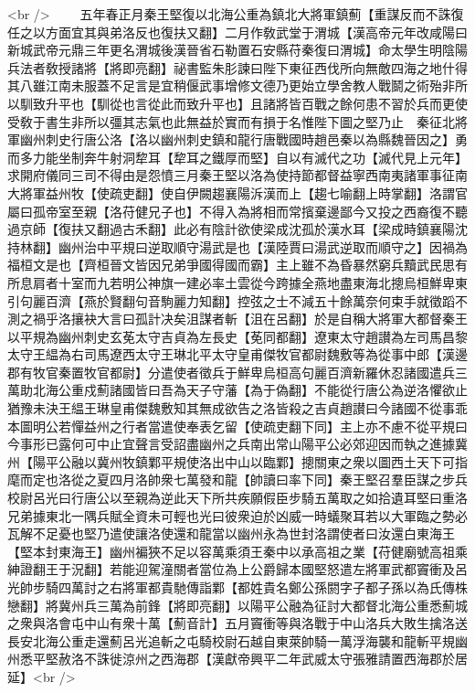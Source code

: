 <br />
　　五年春正月秦王堅復以北海公重為鎮北大將軍鎮薊【重謀反而不誅復任之以方面宜其與弟洛反也復扶又翻】二月作敎武堂于渭城【漢高帝元年改咸陽曰新城武帝元鼎三年更名渭城後漢晉省石勒置石安縣苻秦復曰渭城】命太學生明陰陽兵法者敎授諸將【將即亮翻】祕書監朱肜諫曰陛下東征西伐所向無敵四海之地什得其八雖江南未服蓋不足言是宜稍偃武事增修文德乃更始立學舍教人戰鬬之術殆非所以馴致升平也【馴從也言從此而致升平也】且諸將皆百戰之餘何患不習於兵而更使受敎于書生非所以彊其志氣也此無益於實而有損于名惟陛下圖之堅乃止　秦征北將軍幽州刺史行唐公洛【洛以幽州刺史鎮和龍行唐戰國時趙邑秦以為縣魏晉因之】勇而多力能坐制奔牛射洞犂耳【犂耳之鐵厚而堅】自以有滅代之功【滅代見上元年】求開府儀同三司不得由是怨憤三月秦王堅以洛為使持節都督益寧西南夷諸軍事征南大將軍益州牧【使疏吏翻】使自伊闕趨襄陽泝漢而上【趨七喻翻上時掌翻】洛謂官屬曰孤帝室至親【洛苻健兄子也】不得入為將相而常擯棄邊鄙今又投之西裔復不聽過京師【復扶又翻過古禾翻】此必有陰計欲使梁成沈孤於漢水耳【梁成時鎮襄陽沈持林翻】幽州治中平規曰逆取順守湯武是也【漢陸賈曰湯武逆取而順守之】因禍為福桓文是也【齊桓晉文皆因兄弟爭國得國而霸】主上雖不為昏暴然窮兵黷武民思有所息肩者十室而九若明公神旗一建必率土雲從今跨據全燕地盡東海北摠烏桓鮮卑東引句麗百濟【燕於賢翻句音駒麗力知翻】控弦之士不減五十餘萬奈何束手就徵蹈不測之禍乎洛攘袂大言曰孤計决矣沮謀者斬【沮在呂翻】於是自稱大將軍大都督秦王以平規為幽州刺史玄莬太守吉貞為左長史【莬同都翻】遼東太守趙讃為左司馬昌黎太守王緼為右司馬遼西太守王琳北平太守皇甫傑牧官都尉魏敷等為從事中郎【漢邊郡有牧官秦置牧官都尉】分遣使者徵兵于鮮卑烏桓高句麗百濟新羅休忍諸國遣兵三萬助北海公重戍薊諸國皆曰吾為天子守藩【為于偽翻】不能從行唐公為逆洛懼欲止猶豫未決王緼王琳皇甫傑魏敷知其無成欲告之洛皆殺之吉貞趙讃曰今諸國不從事乖本圖明公若憚益州之行者當遣使奉表乞留【使疏吏翻下同】主上亦不慮不從平規曰今事形已露何可中止宜聲言受詔盡幽州之兵南出常山陽平公必郊迎因而執之進據冀州【陽平公融以冀州牧鎮鄴平規使洛出中山以臨鄴】摠關東之衆以圖西土天下可指麾而定也洛從之夏四月洛帥衆七萬發和龍【帥讀曰率下同】秦王堅召羣臣謀之步兵校尉呂光曰行唐公以至親為逆此天下所共疾願假臣步騎五萬取之如拾遺耳堅曰重洛兄弟據東北一隅兵賦全資未可輕也光曰彼衆迫於凶威一時蟻聚耳若以大軍臨之勢必瓦解不足憂也堅乃遣使讓洛使還和龍當以幽州永為世封洛謂使者曰汝還白東海王【堅本封東海王】幽州褊狹不足以容萬乘須王秦中以承高祖之業【苻健廟號高祖乘紳證翻王于況翻】若能迎駕潼關者當位為上公爵歸本國堅怒遣左將軍武都竇衝及呂光帥步騎四萬討之右將軍都貴馳傳詣鄴【都姓貴名鄭公孫閼字子都子孫以為氏傳株戀翻】將冀州兵三萬為前鋒【將即亮翻】以陽平公融為征討大都督北海公重悉薊城之衆與洛會屯中山有衆十萬【薊音計】五月竇衝等與洛戰于中山洛兵大敗生擒洛送長安北海公重走還薊呂光追斬之屯騎校尉石越自東萊帥騎一萬浮海襲和龍斬平規幽州悉平堅赦洛不誅徙涼州之西海郡【漢獻帝興平二年武威太守張雅請置西海郡於居延】<br />

